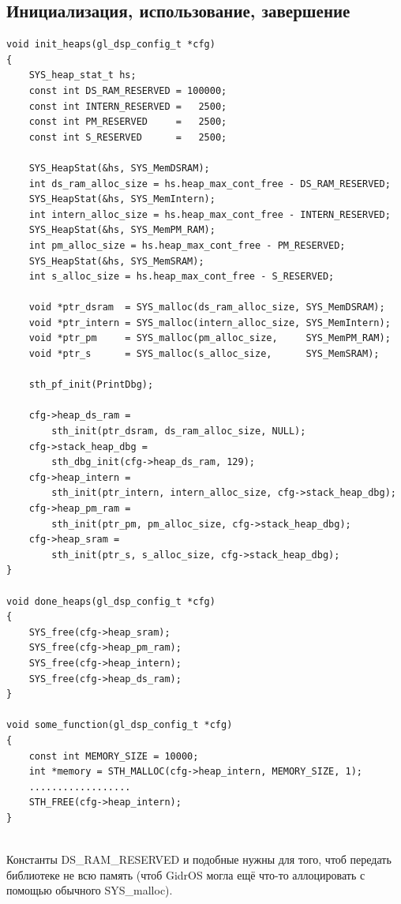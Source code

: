 \documentclass{article}
\begin{document}
\subsection{Инициализация, использование, завершение}
\begin{lstlisting}
void init_heaps(gl_dsp_config_t *cfg)
{
    SYS_heap_stat_t hs;
    const int DS_RAM_RESERVED = 100000;
    const int INTERN_RESERVED =   2500;
    const int PM_RESERVED     =   2500;
    const int S_RESERVED      =   2500;

    SYS_HeapStat(&hs, SYS_MemDSRAM);
    int ds_ram_alloc_size = hs.heap_max_cont_free - DS_RAM_RESERVED;
    SYS_HeapStat(&hs, SYS_MemIntern);
    int intern_alloc_size = hs.heap_max_cont_free - INTERN_RESERVED;
    SYS_HeapStat(&hs, SYS_MemPM_RAM);
    int pm_alloc_size = hs.heap_max_cont_free - PM_RESERVED;
    SYS_HeapStat(&hs, SYS_MemSRAM);
    int s_alloc_size = hs.heap_max_cont_free - S_RESERVED;

    void *ptr_dsram  = SYS_malloc(ds_ram_alloc_size, SYS_MemDSRAM);
    void *ptr_intern = SYS_malloc(intern_alloc_size, SYS_MemIntern);
    void *ptr_pm     = SYS_malloc(pm_alloc_size,     SYS_MemPM_RAM);
    void *ptr_s      = SYS_malloc(s_alloc_size,      SYS_MemSRAM);

    sth_pf_init(PrintDbg);

    cfg->heap_ds_ram =
        sth_init(ptr_dsram, ds_ram_alloc_size, NULL);
    cfg->stack_heap_dbg =
        sth_dbg_init(cfg->heap_ds_ram, 129);
    cfg->heap_intern =
        sth_init(ptr_intern, intern_alloc_size, cfg->stack_heap_dbg);
    cfg->heap_pm_ram =
        sth_init(ptr_pm, pm_alloc_size, cfg->stack_heap_dbg);
    cfg->heap_sram =
        sth_init(ptr_s, s_alloc_size, cfg->stack_heap_dbg);
}

void done_heaps(gl_dsp_config_t *cfg)
{
    SYS_free(cfg->heap_sram);
    SYS_free(cfg->heap_pm_ram);
    SYS_free(cfg->heap_intern);
    SYS_free(cfg->heap_ds_ram);
}

void some_function(gl_dsp_config_t *cfg)
{
    const int MEMORY_SIZE = 10000;
    int *memory = STH_MALLOC(cfg->heap_intern, MEMORY_SIZE, 1);
    ..................
    STH_FREE(cfg->heap_intern);
}


\end{lstlisting}
Константы DS\_RAM\_RESERVED и подобные нужны для того, чтоб передать библиотеке не всю память (чтоб GidrOS могла ещё что-то аллоцировать с помощью обычного SYS\_malloc).

\newpage
\end{document}
